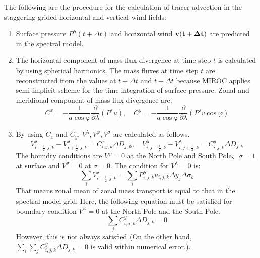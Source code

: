 \documentclass{article}
\begin{document}
The following are the procedure for the calculation of tracer advection in the staggering-grided horizontal and vertical wind fields:
\begin{enumerate}
\item Surface pressure $P^{S}(t+\Delta t)$ and horizontal wind $\bf{v}(t+\Delta t)$ are predicted in the spectral model.
\item The horizontal component of mass flux divergence at time step $t$ is calculated by using spherical harmonics. The mass fluxes at time step $t$ are reconstructed from the values at $t+\Delta t$ and $t-\Delta t$ because MIROC applies semi-implicit scheme for the time-integration of surface pressure. Zonal and meridional component of mass flux divergence are: 
  \begin{equation}
    C^{x}=-\frac{1}{a \cos \varphi}\frac{\partial}{\partial \lambda}(P^{s}u),\quad C^{y}=-\frac{1}{a \cos \varphi}\frac{\partial}{\partial \lambda}(P^{s}v \cos \varphi) 
  \end{equation}
\item By using $C_{x}$ and $C_{y}$, $V^{\lambda}, V^{\varphi}, V^{\sigma}$ are calculated as follows.
  \begin{equation}
    V^{\lambda}_{i-\frac{1}{2},j,k}-V^{\lambda}_{i+\frac{1}{2},j,k}=C^{x}_{i,j,k}\Delta D_{j,k}, \quad V^{\lambda}_{i,j-\frac{1}{2},k}-V^{\lambda}_{i,j+\frac{1}{2},k}=C^{y}_{i,j,k}\Delta D_{j,k}
  \end{equation}
  The boundry conditions are $V^{\varphi}=0$ at the North Pole and South Pole、$\sigma=1$ at surface and $V^{\sigma}=0$ at $\sigma=0$.
The condition for $V^{\lambda}=0$ is:
  \begin{equation}
    \sum_{i}V^{\lambda}_{i-\frac{1}{2},j,k}=\sum_{i}P^{S}_{i,j,k}u_{i,j,k}\Delta y_{j}\Delta \sigma_{k}
  \end{equation}
  That means zonal mean of zonal mass transport is equal to that in the spectral model grid.
  Here, the following equation must be satisfied for boundary condition $V^{\varphi}=0$ at the North Pole and the South Pole. 
  \begin{equation}
    \sum_{j}C^{y}_{i,j,k}\Delta D_{j,k}=0
  \end{equation}
  However, this is not always satisfied (On the other hand, $\sum_{i} \sum_{j}C^{y}_{i,j,k}\Delta D_{j,k}=0$ is valid within numerical error.).


\end{enumerate}
\end{document}
